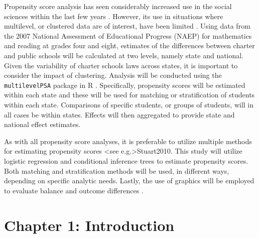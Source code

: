 \documentclass[letterpaper,12p,twoside]{article} %
\begin{document}
Propensity score analysis has seen considerably increased use in the social sciences within the last few years . However, its use in situations where multilevel, or clustered data are of interest, have been limited . Using data from the 2007 National Assessment of Educational Progress (NAEP) for mathematics and reading at grades four and eight, estimates of the differences between charter and public schools will be calculated at two levels, namely state and national. Given the variability of charter schools laws across states, it is important to consider the impact of clustering. Analysis will be conducted using the \texttt{multilevelPSA} package in R . Specifically, propensity scores will be estimated within each state and these will be used for matching or stratification of students within each state. Comparisons of specific students, or groups of students, will in all cases be within states. Effects will then aggregated to provide state and national effect estimates.

As with all propensity score analyses, it is preferable to utilize multiple methods for estimating propensity scores \citeA<see e.g.>{Stuart2010}. This study will utilize logistic regression and conditional inference trees  to estimate propensity scores. Both matching and stratification methods will be used, in different ways, depending on specific analytic needs. Lastly, the use of graphics will be employed to evaluate balance and outcome differences .

\cleardoublepage 

\setcounter{tocdepth}{5}
\tableofcontents
\cleardoublepage
{}  \listoftables
\cleardoublepage
{} \listoffigures

\cleardoublepage
{}
\setcounter{page}{1}
\section{Chapter 1: Introduction}
\end{document}
